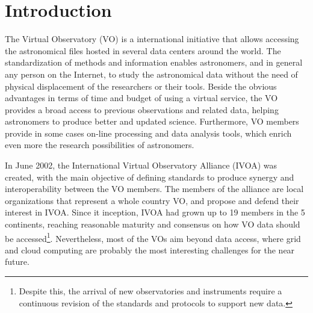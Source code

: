 \section{Introduction}
The Virtual Observatory (VO) \cite{Borne2013,HanischQuinn2003} is a
international initiative that allows accessing the astronomical files hosted in
several data centers around the world. The standardization of methods and information 
enables astronomers, and in general any person on the Internet, to study the 
astronomical data without the need of physical displacement of the researchers 
or their tools. Beside the obvious advantages in terms of time and budget of 
using a virtual service, the VO provides a broad access to previous observations
and related data, helping astronomers to produce better and updated
science. Furthermore, VO members provide in some cases on-line processing and
data analysis tools, which enrich even more the research possibilities of
astronomers. 

In June 2002, the International Virtual Observatory Alliance (IVOA)
\cite{website:ivoa-home} was created, with the main objective of
defining standards to produce synergy and interoperability between the
VO members. The members of the alliance are local organizations that represent
a whole country VO, and propose and defend their interest in IVOA.
Since it inception, IVOA had grown up to 19 members in the 5 continents,
reaching reasonable maturity and consensus on how VO data should be
accessed\footnote{Despite this, the arrival of new observatories and instruments 
require a continuous revision of the standards and protocols to support new
data.}.
Nevertheless, most of the VOs aim beyond data access, where grid and cloud computing
are probably the most interesting challenges for the near future. 



